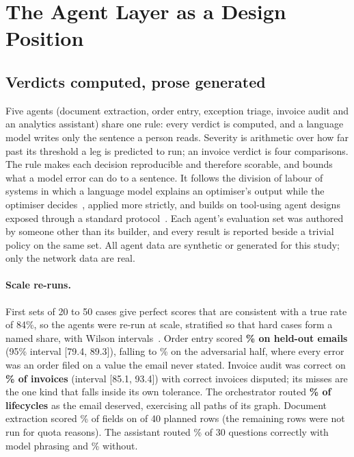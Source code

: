 \section{The Agent Layer as a Design Position}\label{sec:agents}

\subsection{Verdicts computed, prose generated}
Five agents (document extraction, order entry, exception triage, invoice audit and an analytics assistant) share one rule: every verdict is computed, and a language model writes only the sentence a person reads. Severity is arithmetic over how far past its threshold a leg is predicted to run; an invoice verdict is four comparisons. The rule makes each decision reproducible and therefore scorable, and bounds what a model error can do to a sentence. It follows the division of labour of systems in which a language model explains an optimiser's output while the optimiser decides~\cite{li2023optiguide}, applied more strictly, and builds on tool-using agent designs~\cite{yao2023react,wang2024survey,xi2023rise} exposed through a standard protocol~\cite{mcp2025specification}. Each agent's evaluation set was authored by someone other than its builder, and every result is reported beside a trivial policy on the same set. All agent data are synthetic or generated for this study; only the network data are real.

\paragraph{Scale re-runs.} First sets of 20 to 50 cases give perfect scores that are consistent with a true rate of 84\%, so the agents were re-run at scale, stratified so that hard cases form a named share, with Wilson intervals~\cite{wilson1927probable,agresti1998approximate}. Order entry scored \textbf{\fzOrderEvalScaleHeldoutPct{}\% on \fzOrderEvalScaleCases{} held-out emails} (95\% interval [79.4, 89.3]), falling to \fzOrderEvalScaleAdversarialHeldoutPct{}\% on the adversarial half, where every error was an order filed on a value the email never stated. Invoice audit was correct on \textbf{\fzInvoiceEvalScaleAccuracyPct{}\% of \fzInvoiceEvalScaleCases{} invoices} (interval [85.1, 93.4]) with \fzInvoiceEvalScaleFalseDisputes{} correct invoices disputed; its misses are the one kind that falls inside its own tolerance. The orchestrator routed \textbf{\fzLifecycleEvalScaleRoutingPct{}\% of \fzLifecycleEvalScaleCases{} lifecycles} as the email deserved, exercising all \fzLifecycleEvalScalePaths{} paths of its graph. Document extraction scored \fzDocExtractionAccuracyPct{}\% of fields on \fzDocExtractionRows{} of 40 planned rows (the remaining rows were not run for quota reasons). The assistant routed \fzAssistantRouteAccuracyLlmPct{}\% of 30 questions correctly with model phrasing and \fzAssistantRouteAccuracyPct{}\% without.

